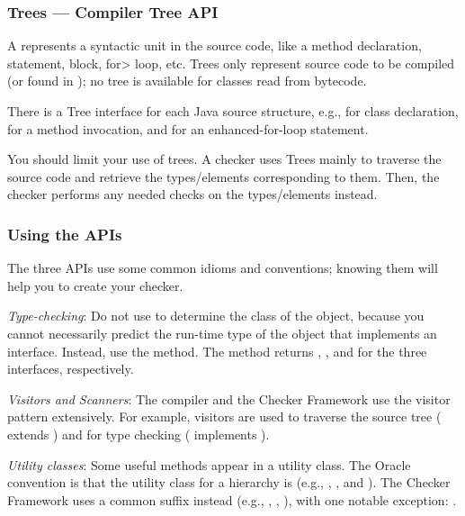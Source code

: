 \subsubsection{Trees --- Compiler Tree API\label{javac-trees}}

A  represents a syntactic unit in the source code,
like a method declaration, statement, block, \<for> loop, etc. Trees only
represent source code to be compiled (or found in );
no tree is available for classes read from bytecode.

There is a Tree interface for each Java source structure, e.g.,
 for class declaration, 
for a method invocation, and  for an enhanced-for-loop
statement.

You should limit your use of trees. A checker uses Trees mainly to
traverse the source code and retrieve the types/elements corresponding to
them.  Then, the checker performs any needed checks on the types/elements instead.


\subsubsection{Using the APIs\label{using-the-apis}}

The three APIs use some common idioms and conventions; knowing them will
help you to create your checker.

\emph{Type-checking}:
Do not use  to determine the class of the object,
because you cannot necessarily predict the run-time type of the object that
implements an interface.  Instead, use the  method.  The
method returns ,
, and 
for the three interfaces, respectively.

\emph{Visitors and Scanners}:
The compiler and the Checker Framework use the visitor pattern
extensively. For example, visitors are used to traverse the source tree
( extends
) and for type
checking ( implements
).

\emph{Utility classes}:
Some useful methods appear in a utility class.  The Oracle convention is that
the utility class for a  hierarchy is  (e.g.,
, , and
).  The Checker Framework uses a common
 suffix instead (e.g., ,
, ), with one
notable exception: .


